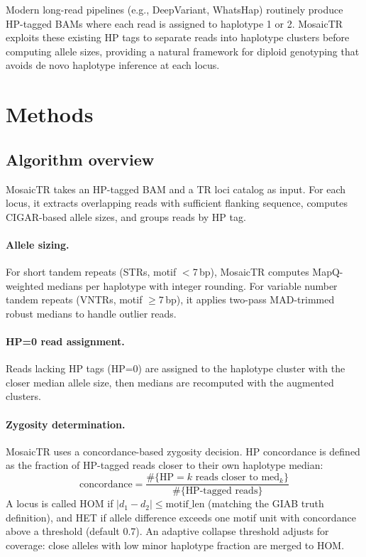 \documentclass[12pt]{article}
\begin{document}
Modern long-read pipelines (e.g., DeepVariant, WhatsHap) routinely produce HP-tagged BAMs where each read is assigned to haplotype 1 or 2.
MosaicTR exploits these existing HP tags to separate reads into haplotype clusters before computing allele sizes, providing a natural framework for diploid genotyping that avoids de novo haplotype inference at each locus.

\section*{Methods}

\subsection*{Algorithm overview}

MosaicTR takes an HP-tagged BAM and a TR loci catalog as input.
For each locus, it extracts overlapping reads with sufficient flanking sequence, computes CIGAR-based allele sizes, and groups reads by HP tag.

\paragraph{Allele sizing.}
For short tandem repeats (STRs, motif $<$7\,bp), MosaicTR computes MapQ-weighted medians per haplotype with integer rounding.
For variable number tandem repeats (VNTRs, motif $\geq$7\,bp), it applies two-pass MAD-trimmed robust medians to handle outlier reads.

\paragraph{HP=0 read assignment.}
Reads lacking HP tags (HP=0) are assigned to the haplotype cluster with the closer median allele size, then medians are recomputed with the augmented clusters.

\paragraph{Zygosity determination.}
MosaicTR uses a concordance-based zygosity decision.
HP concordance is defined as the fraction of HP-tagged reads closer to their own haplotype median:
\begin{equation}
\text{concordance} = \frac{\#\{\text{HP}=k \text{ reads closer to } \text{med}_k\}}{\#\{\text{HP-tagged reads}\}}
\end{equation}
A locus is called HOM if $|d_1 - d_2| \leq \text{motif\_len}$ (matching the GIAB truth definition), and HET if allele difference exceeds one motif unit with concordance above a threshold (default 0.7).
An adaptive collapse threshold adjusts for coverage: close alleles with low minor haplotype fraction are merged to HOM.
\end{document}
